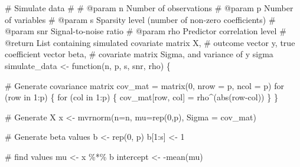 \documentclass[
  letterpaper,
]{latex/krantz}
\makeatletter
\newenvironment{Shaded}{\begin{snugshade}}{\end{snugshade}}
\newcommand{\AttributeTok}[1]{\textcolor[rgb]{0.40,0.45,0.13}{#1}}
\newcommand{\CommentTok}[1]{\textcolor[rgb]{0.37,0.37,0.37}{#1}}
\newcommand{\ControlFlowTok}[1]{\textcolor[rgb]{0.00,0.23,0.31}{#1}}
\newcommand{\DecValTok}[1]{\textcolor[rgb]{0.68,0.00,0.00}{#1}}
\newcommand{\FunctionTok}[1]{\textcolor[rgb]{0.28,0.35,0.67}{#1}}
\newcommand{\NormalTok}[1]{\textcolor[rgb]{0.00,0.23,0.31}{#1}}
\newcommand{\OtherTok}[1]{\textcolor[rgb]{0.00,0.23,0.31}{#1}}
\newcommand{\SpecialCharTok}[1]{\textcolor[rgb]{0.37,0.37,0.37}{#1}}
\newenvironment{kframe}{%
\medskip{}
\setlength{\fboxsep}{.8em}
 \def\at@end@of@kframe{}%
 \ifinner\ifhmode%
  \def\at@end@of@kframe{\end{minipage}}%
  \begin{minipage}{\columnwidth}%
 \fi\fi%
 \def\FrameCommand##1{\hskip\@totalleftmargin \hskip-\fboxsep
 \colorbox{shadecolor}{##1}\hskip-\fboxsep
     \hskip-\linewidth \hskip-\@totalleftmargin \hskip\columnwidth}%
 \MakeFramed {\advance\hsize-\width
   \@totalleftmargin\z@ \linewidth\hsize
   \@setminipage}}%
 {\par\unskip\endMakeFramed%
 \at@end@of@kframe}
\renewenvironment{Shaded}{\begin{kframe}}{\end{kframe}}
\makeatother
\begin{document}
\begin{Shaded}
\begin{Highlighting}[]
\CommentTok{\#\textquotesingle{} Simulate data}
\CommentTok{\#\textquotesingle{}}
\CommentTok{\#\textquotesingle{} @param n Number of observations}
\CommentTok{\#\textquotesingle{} @param p Number of variables}
\CommentTok{\#\textquotesingle{} @param s Sparsity level (number of non{-}zero coefficients)}
\CommentTok{\#\textquotesingle{} @param snr Signal{-}to{-}noise ratio}
\CommentTok{\#\textquotesingle{} @param rho Predictor correlation level}
\CommentTok{\#\textquotesingle{} @return List containing simulated covariate matrix \textasciigrave{}X\textasciigrave{}, }
\CommentTok{\#\textquotesingle{} outcome vector \textasciigrave{}y\textasciigrave{}, true coefficient vector \textasciigrave{}beta\textasciigrave{}, }
\CommentTok{\#\textquotesingle{} covariate matrix \textasciigrave{}Sigma\textasciigrave{}, and variance of y \textasciigrave{}sigma\textasciigrave{}}
\NormalTok{simulate\_data }\OtherTok{\textless{}{-}} \ControlFlowTok{function}\NormalTok{(n, p, s, snr, rho) \{}
  
  \CommentTok{\# Generate covariance matrix}
\NormalTok{  cov\_mat }\OtherTok{=} \FunctionTok{matrix}\NormalTok{(}\DecValTok{0}\NormalTok{, }\AttributeTok{nrow =}\NormalTok{ p, }\AttributeTok{ncol =}\NormalTok{ p)}
  \ControlFlowTok{for}\NormalTok{ (row }\ControlFlowTok{in} \DecValTok{1}\SpecialCharTok{:}\NormalTok{p) \{}
    \ControlFlowTok{for}\NormalTok{ (col }\ControlFlowTok{in} \DecValTok{1}\SpecialCharTok{:}\NormalTok{p) \{}
\NormalTok{      cov\_mat[row, col] }\OtherTok{=}\NormalTok{ rho}\SpecialCharTok{\^{}}\NormalTok{(}\FunctionTok{abs}\NormalTok{(row}\SpecialCharTok{{-}}\NormalTok{col))}
\NormalTok{    \}}
\NormalTok{  \}}
  
  \CommentTok{\# Generate X }
\NormalTok{  x }\OtherTok{\textless{}{-}} \FunctionTok{mvrnorm}\NormalTok{(}\AttributeTok{n=}\NormalTok{n, }\AttributeTok{mu=}\FunctionTok{rep}\NormalTok{(}\DecValTok{0}\NormalTok{,p), }\AttributeTok{Sigma =}\NormalTok{ cov\_mat)}

  \CommentTok{\# Generate beta values }
\NormalTok{  b }\OtherTok{\textless{}{-}} \FunctionTok{rep}\NormalTok{(}\DecValTok{0}\NormalTok{, p)}
\NormalTok{  b[}\DecValTok{1}\SpecialCharTok{:}\NormalTok{s] }\OtherTok{\textless{}{-}} \DecValTok{1}
 
  \CommentTok{\# find values}
\NormalTok{  mu }\OtherTok{\textless{}{-}}\NormalTok{ x }\SpecialCharTok{\%*\%}\NormalTok{ b}
\NormalTok{  intercept }\OtherTok{\textless{}{-}} \SpecialCharTok{{-}}\FunctionTok{mean}\NormalTok{(mu)}
  

\end{Highlighting}
\end{Shaded}
\end{document}
